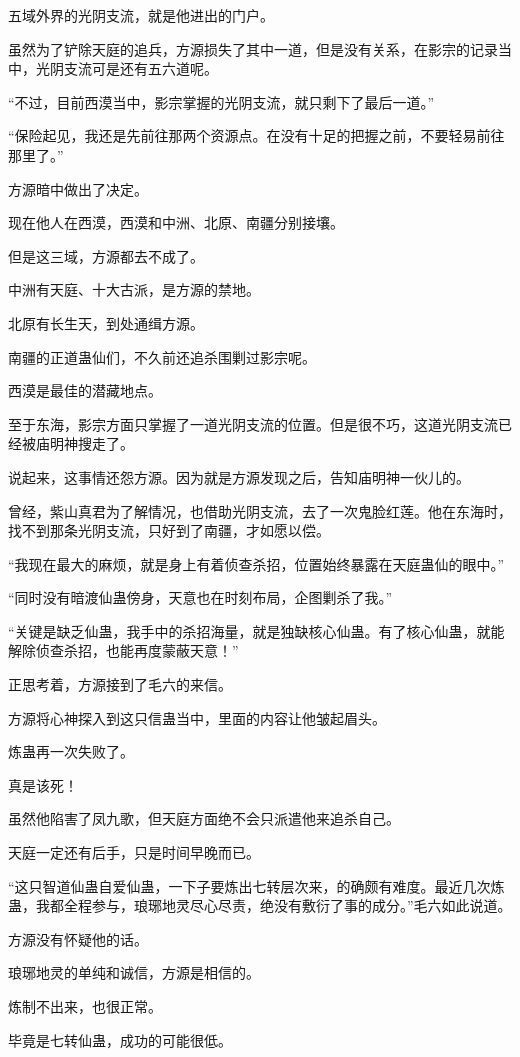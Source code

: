 \begin{this_body}
五域外界的光阴支流，就是他进出的门户。

虽然为了铲除天庭的追兵，方源损失了其中一道，但是没有关系，在影宗的记录当中，光阴支流可是还有五六道呢。

“不过，目前西漠当中，影宗掌握的光阴支流，就只剩下了最后一道。”

“保险起见，我还是先前往那两个资源点。在没有十足的把握之前，不要轻易前往那里了。”

方源暗中做出了决定。

现在他人在西漠，西漠和中洲、北原、南疆分别接壤。

但是这三域，方源都去不成了。

中洲有天庭、十大古派，是方源的禁地。

北原有长生天，到处通缉方源。

南疆的正道蛊仙们，不久前还追杀围剿过影宗呢。

西漠是最佳的潜藏地点。

至于东海，影宗方面只掌握了一道光阴支流的位置。但是很不巧，这道光阴支流已经被庙明神搜走了。

说起来，这事情还怨方源。因为就是方源发现之后，告知庙明神一伙儿的。

曾经，紫山真君为了解情况，也借助光阴支流，去了一次鬼脸红莲。他在东海时，找不到那条光阴支流，只好到了南疆，才如愿以偿。

“我现在最大的麻烦，就是身上有着侦查杀招，位置始终暴露在天庭蛊仙的眼中。”

“同时没有暗渡仙蛊傍身，天意也在时刻布局，企图剿杀了我。”

“关键是缺乏仙蛊，我手中的杀招海量，就是独缺核心仙蛊。有了核心仙蛊，就能解除侦查杀招，也能再度蒙蔽天意！”

正思考着，方源接到了毛六的来信。

方源将心神探入到这只信蛊当中，里面的内容让他皱起眉头。

炼蛊再一次失败了。

真是该死！

虽然他陷害了凤九歌，但天庭方面绝不会只派遣他来追杀自己。

天庭一定还有后手，只是时间早晚而已。

“这只智道仙蛊自爱仙蛊，一下子要炼出七转层次来，的确颇有难度。最近几次炼蛊，我都全程参与，琅琊地灵尽心尽责，绝没有敷衍了事的成分。”毛六如此说道。

方源没有怀疑他的话。

琅琊地灵的单纯和诚信，方源是相信的。

炼制不出来，也很正常。

毕竟是七转仙蛊，成功的可能很低。


\end{this_body}
